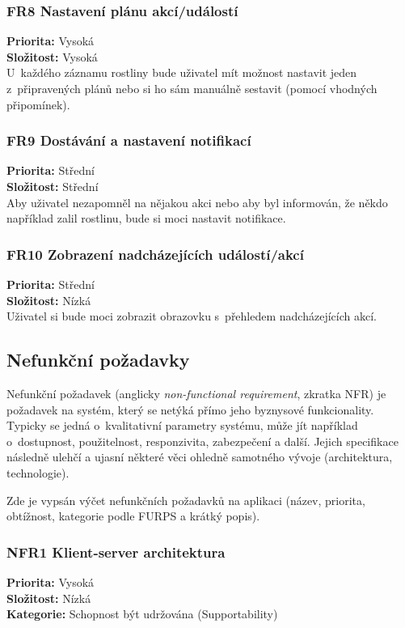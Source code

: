 \documentclass[thesis=M,czech]{FITthesis}[2019/12/23]
\begin{document}
\subsubsection*{FR8 Nastavení plánu akcí/událostí}
\textbf{Priorita:} Vysoká \\
\textbf{Složitost:} Vysoká \\

U~každého záznamu rostliny bude uživatel mít možnost nastavit jeden z~připravených plánů nebo si ho sám manuálně sestavit (pomocí vhodných připomínek).

\subsubsection*{FR9 Dostávání a nastavení notifikací}
\textbf{Priorita:} Střední \\
\textbf{Složitost:} Střední \\

Aby uživatel nezapomněl na nějakou akci nebo aby byl informován, že někdo například zalil rostlinu, bude si moci nastavit notifikace.

\subsubsection*{FR10 Zobrazení nadcházejících událostí/akcí}
\textbf{Priorita:} Střední \\
\textbf{Složitost:}  Nízká \\

Uživatel si bude moci zobrazit obrazovku s~přehledem nadcházejících akcí.

\subsection{Nefunkční požadavky}
\label{doc:nfr}
 Nefunkční požadavek (anglicky \textit{non-functional requirement}, zkratka NFR) je požadavek na systém, který se netýká přímo jeho byznysové funkcionality. Typicky se jedná o~kvalitativní parametry systému, může jít například o~dostupnost, použitelnost, responzivita, zabezpečení a další. Jejich specifikace následně ulehčí a ujasní některé věci ohledně samotného vývoje (architektura, technologie). \cite{nonfunctional-requirements}
 
 Zde je vypsán výčet nefunkčních požadavků na aplikaci (název, priorita, obtížnost, kategorie podle FURPS a krátký popis).
 
\subsubsection*{NFR1 Klient-server architektura}
\textbf{Priorita:} Vysoká \\
\textbf{Složitost:} Nízká \\
\textbf{Kategorie:} Schopnost být udržována (Supportability) \\
\end{document}
